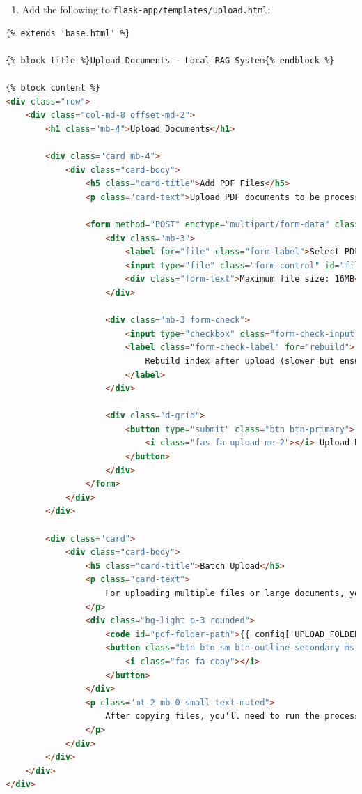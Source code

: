 \documentclass[
  screen,review,acmlarge]{acmart}
\newcommand{\passthrough}[1]{#1}
\providecommand{\tightlist}{%
  \setlength{\itemsep}{0pt}\setlength{\parskip}{0pt}}
\begin{document}
\begin{enumerate}
\def\labelenumi{\arabic{enumi}.}
\setcounter{enumi}{7}
\tightlist
\item
  Add the following to \passthrough{\lstinline!flask-app/templates/upload.html!}:
\end{enumerate}

\begin{lstlisting}[language=HTML]
{% extends 'base.html' %}

{% block title %}Upload Documents - Local RAG System{% endblock %}

{% block content %}
<div class="row">
    <div class="col-md-8 offset-md-2">
        <h1 class="mb-4">Upload Documents</h1>
        
        <div class="card mb-4">
            <div class="card-body">
                <h5 class="card-title">Add PDF Files</h5>
                <p class="card-text">Upload PDF documents to be processed and added to the knowledge base.</p>
                
                <form method="POST" enctype="multipart/form-data" class="mt-4">
                    <div class="mb-3">
                        <label for="file" class="form-label">Select PDF File</label>
                        <input type="file" class="form-control" id="file" name="file" accept=".pdf" required>
                        <div class="form-text">Maximum file size: 16MB</div>
                    </div>
                    
                    <div class="mb-3 form-check">
                        <input type="checkbox" class="form-check-input" id="rebuild" name="rebuild">
                        <label class="form-check-label" for="rebuild">
                            Rebuild index after upload (slower but ensures immediate availability)
                        </label>
                    </div>
                    
                    <div class="d-grid">
                        <button type="submit" class="btn btn-primary">
                            <i class="fas fa-upload me-2"></i> Upload Document
                        </button>
                    </div>
                </form>
            </div>
        </div>
        
        <div class="card">
            <div class="card-body">
                <h5 class="card-title">Batch Upload</h5>
                <p class="card-text">
                    For uploading multiple files or large documents, you can directly copy files to the documents directory:
                </p>
                <div class="bg-light p-3 rounded">
                    <code id="pdf-folder-path">{{ config['UPLOAD_FOLDER'] }}</code>
                    <button class="btn btn-sm btn-outline-secondary ms-2" onclick="copyToClipboard('pdf-folder-path')">
                        <i class="fas fa-copy"></i>
                    </button>
                </div>
                <p class="mt-2 mb-0 small text-muted">
                    After copying files, you'll need to run the processing pipeline to index the documents.
                </p>
            </div>
        </div>
    </div>
</div>


\end{lstlisting}
\end{document}
